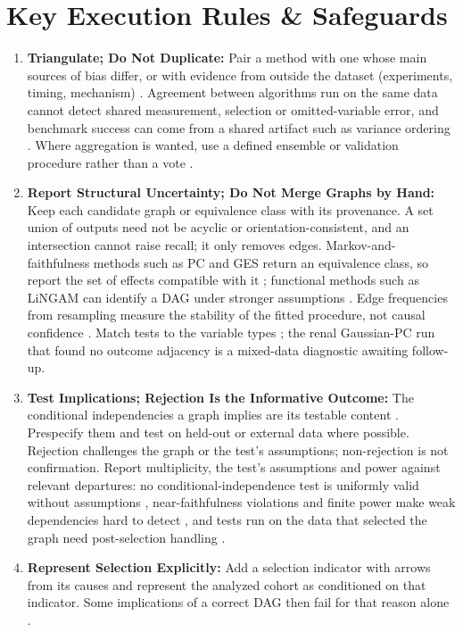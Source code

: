 \documentclass[10pt,a4paper]{article}
\begin{document}
\section*{Key Execution Rules \& Safeguards}
\begin{enumerate}\small
    \item \textbf{Triangulate; Do Not Duplicate:} Pair a method with one whose main sources of bias differ, or with evidence from outside the dataset (experiments, timing, mechanism) \citep{Lawlor2016,MunafoDaveySmith2018}. Agreement between algorithms run on the same data cannot detect shared measurement, selection or omitted-variable error, and benchmark success can come from a shared artifact such as variance ordering \citep{Reisach2021}. Where aggregation is wanted, use a defined ensemble or validation procedure rather than a vote \citep{Viinikka2018,Chowdhury2022}.
    \item \textbf{Report Structural Uncertainty; Do Not Merge Graphs by Hand:} Keep each candidate graph or equivalence class with its provenance. A set union of outputs need not be acyclic or orientation-consistent, and an intersection cannot raise recall; it only removes edges. Markov-and-faithfulness methods such as PC and GES return an equivalence class, so report the set of effects compatible with it \citep{Spirtes2000,Maathuis2009}; functional methods such as LiNGAM can identify a DAG under stronger assumptions \citep{Shimizu2006}. Edge frequencies from resampling measure the stability of the fitted procedure, not causal confidence \citep{Friedman1999,ScutariNagarajan2013}. Match tests to the variable types \citep{Sedgewick2019,Tsagris2018}; the renal Gaussian-PC run that found no outcome adjacency is a mixed-data diagnostic awaiting follow-up.
    \item \textbf{Test Implications; Rejection Is the Informative Outcome:} The conditional independencies a graph implies are its testable content \citep{Textor2016,Ankan2021}. Prespecify them and test on held-out or external data where possible. Rejection challenges the graph or the test's assumptions; non-rejection is not confirmation. Report multiplicity, the test's assumptions and power against relevant departures: no conditional-independence test is uniformly valid without assumptions \citep{ShahPeters2020}, near-faithfulness violations and finite power make weak dependencies hard to detect \citep{Uhler2013,ZhangSpirtes2003}, and tests run on the data that selected the graph need post-selection handling \citep{Chang2026}.
    \item \textbf{Represent Selection Explicitly:} Add a selection indicator with arrows from its causes and represent the analyzed cohort as conditioned on that indicator. Some implications of a correct DAG then fail for that reason alone \citep{HernanSelection2004}.

\end{enumerate}
\end{document}
